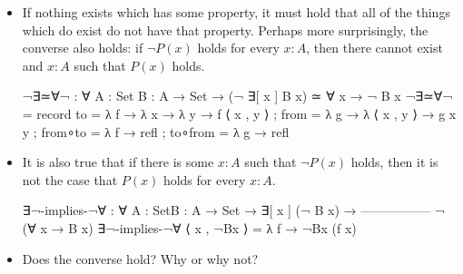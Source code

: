 \documentclass{lecturenotes}
\begin{document}
\begin{itemize}
\item If nothing exists which has some property, it must hold that all of the things which do exist do not have that property.
  Perhaps more surprisingly, the converse also holds: if $\lnot P(x)$ holds for every $x \colon A$, then there cannot exist and $x \colon A$ such that $P(x)$ holds.
\begin{code}
¬∃≃∀¬ : ∀ {A : Set} {B : A → Set} →
  (¬ ∃[ x ] B x) ≃ ∀ x → ¬ B x
¬∃≃∀¬ =
  record
  {
    to      = λ {f → λ {x → λ {y → f ⟨ x , y ⟩} }}
  ; from    = λ {g → λ { ⟨ x , y ⟩ → g x y}}
  ; from∘to = λ f → refl
  ; to∘from = λ g → refl
  }    
\end{code}
\item It is also true that if there is some $x \colon A$ such that $\lnot P(x)$ holds, then it is not the case that $P(x)$ holds for every $x \colon A$.
\begin{code}
∃¬-implies-¬∀ : ∀ {A : Set}{B : A → Set} →
  ∃[ x ] (¬ B x) →
  -----------------
    ¬ (∀ x → B x)
∃¬-implies-¬∀ ⟨ x , ¬Bx ⟩ = λ {f → ¬Bx (f x)}    
\end{code}
\item Does the converse hold? Why or why not?
\end{itemize}
\end{document}
